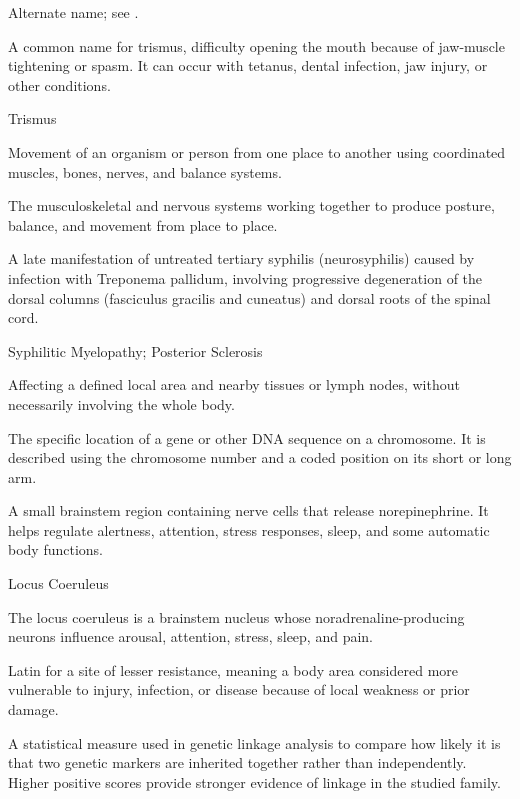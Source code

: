  Alternate name; see .

 A common name for trismus, difficulty opening the mouth because of jaw-muscle tightening or spasm. It can occur with tetanus, dental infection, jaw injury, or other conditions.

\synonyms
Trismus

 Movement of an organism or person from one place to another using coordinated muscles, bones, nerves, and balance systems.

 The musculoskeletal and nervous systems working together to produce posture, balance, and movement from place to place.

 A late manifestation of untreated tertiary syphilis (neurosyphilis) caused by infection
with Treponema pallidum, involving progressive degeneration of the dorsal columns
(fasciculus gracilis and cuneatus) and dorsal roots of the spinal cord.

\synonyms
Syphilitic Myelopathy; Posterior Sclerosis

 Affecting a defined local area and nearby tissues or lymph nodes, without necessarily involving the whole body.

 The specific location of a gene or other DNA sequence on a chromosome. It is described using the chromosome number and a coded position on its short or long arm.

 A small brainstem region containing nerve cells that release norepinephrine. It helps regulate alertness, attention, stress responses, sleep, and some automatic body functions.

\synonyms
Locus Coeruleus

 The locus coeruleus is a brainstem nucleus whose noradrenaline-producing neurons influence arousal, attention, stress, sleep, and pain.

 Latin for a site of lesser resistance, meaning a body area considered more vulnerable to injury, infection, or disease because of local weakness or prior damage.

 A statistical measure used in genetic linkage analysis to compare how likely it is that two genetic markers are inherited together rather than independently. Higher positive scores provide stronger evidence of linkage in the studied family.

